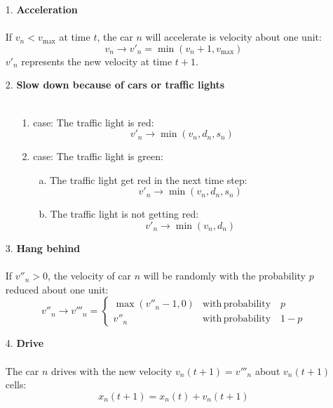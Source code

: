 \documentclass[11pt]{article}
\begin{document}
\begin{itemize}
\item[1.]	\textbf{Acceleration}\\
\\
If $v_n<v_{\mathrm{max}}$ at time $t$, the car $n$ will accelerate is velocity about one unit:
\begin{equation}
v_n \rightarrow v'_n = \min(v_n+1,v_\mathrm{max})
\label{accel_t}
\end{equation}
$v'_n$ represents the new velocity at time $t+1$.
\item[2.]  \textbf{Slow down because of cars or traffic lights}\\
\\
\begin{itemize}
\item[1.]case: The traffic light is red:
\begin{equation}
v'_n \rightarrow \min(v_n,d_n,s_n)
\end{equation}
\item[2.]case: The traffic light is green:
\begin{itemize}
\item[a.] The traffic light get red in the next time step:
\begin{equation}
v'_n \rightarrow \min(v_n,d_n,s_n)
\end{equation}
\item[b.] The traffic light is not getting red:
\begin{equation}
v'_n \rightarrow \min(v_n,d_n)
\end{equation}
\end{itemize}

\end{itemize}
\item[3.]  \textbf{Hang behind}\\
\\
If $v''_n>0$, the velocity of car $n$ will be randomly with the probability $p$ reduced about one unit:
\begin{equation}
v''_n \rightarrow v'''_n=
\begin{cases}
\max(v''_n-1,0) & \mathrm{with\,probability} \quad p\\
v''_n & \mathrm{with\,probability} \quad 1-p
\end{cases}
\label{hangb}
\end{equation}
\item[4.] \textbf{Drive}\\
\\
The car $n$ drives with the new velocity $v_n(t+1)=v'''_n$ about $v_n(t+1)$ cells:
\begin{equation}
x_n(t+1)=x_n(t)+v_n(t+1)
\label{drive}
\end{equation}
\end{itemize}
\end{document}
